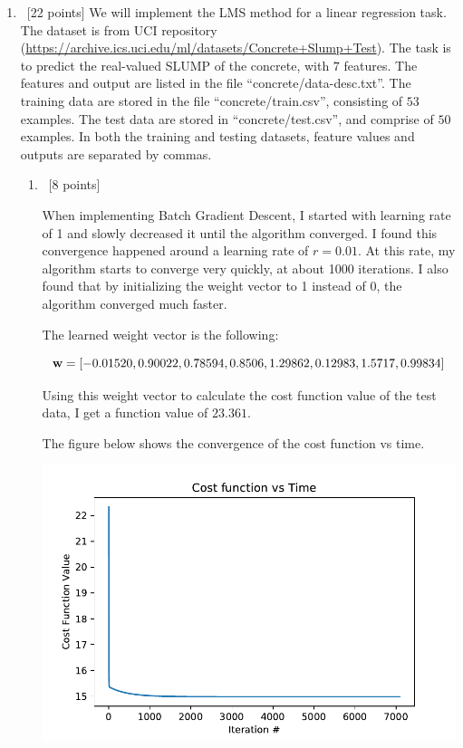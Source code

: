 \documentclass[12pt, fullpage,letterpaper]{article}
\begin{document}
\begin{enumerate}
	\item~[22 points] We will implement the LMS method for a linear regression task. The dataset is from UCI repository (\url{https://archive.ics.uci.edu/ml/datasets/Concrete+Slump+Test}). The task is to predict the real-valued SLUMP of the concrete, with $7$ features. The features and output are listed in the file ``concrete/data-desc.txt''. The training data are stored in the file ``concrete/train.csv'', consisting of $53$ examples. The test data are stored in ``concrete/test.csv'', and comprise of $50$ examples. In both the training and testing datasets, feature values and outputs are separated by commas. 
	
	\begin{enumerate}
		\item~[8 points] 
		
		
		When implementing Batch Gradient Descent, I started with learning rate of 1 and slowly decreased it until the algorithm converged. I found this convergence happened around a learning rate of $r=0.01$. At this rate, my algorithm starts to converge very quickly, at about 1000 iterations. I also found that by initializing the weight vector to 1 instead of 0, the algorithm converged much faster.
		
		The learned weight vector is the following:
		
		\[
			{\bf w} =  [-0.01520,0.90022,0.78594,0.8506, 1.29862,0.12983,  1.5717 ,  0.99834] 
		\]
		
		Using this weight vector to calculate the cost function value of the test data, I get a function value of $23.361$.
		
		The figure below shows the convergence of the cost function vs time.
		
		
		
		
		\includegraphics{BGD_cost_vs_time.pdf}
		

\end{enumerate}
\end{enumerate}
\end{document}
